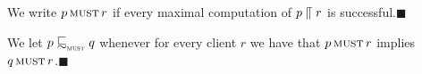 






\begin{definition}%
  \label{def:must-extensional}
  We write $p \operatorname{\textsc{must}} r $ if every maximal
  computation of $p \mathrel{\llceil} r$ is successful.\hfill$\blacksquare$
\end{definition}



\begin{definition}[\mustpreorder]%
  \label{def:testleq}
  \label{def:testleqS}
We let $ \server \testleqS \serverB$ whenever for every
client $r$ we have that
$p \operatorname{\textsc{must}} r$ implies $q \operatorname{\textsc{must}} r$.\hfill$\blacksquare$
\end{definition}


% 

